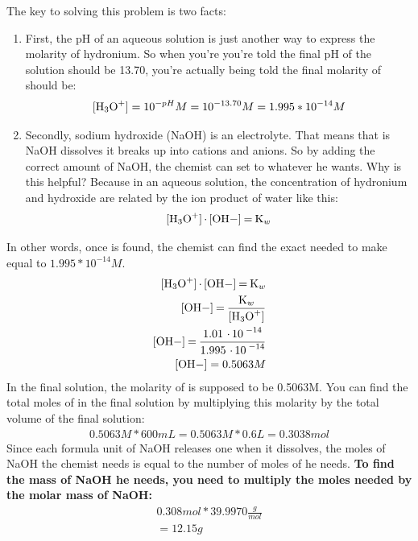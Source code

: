 \documentclass{article}  %
\begin{document}
The key to solving this problem is two facts:
\begin{enumerate}
    \item First, the pH of an aqueous solution is just another way to express \ce{[H3O+]} the molarity of hydronium. So when you're you're told the final pH of the solution should be 13.70, you're actually being told the final molarity of  should be:
    \begin{equation*}
        \begin{aligned}
            \ce{[H3O+]} = 10^{-pH}M = 10^{-13.70}M = 1.995*10^{-14}M
        \end{aligned}
    \end{equation*}
    \item Secondly, sodium hydroxide (NaOH) is an electrolyte. That means that is NaOH dissolves it breaks up into  cations and  anions. So by adding the correct amount of NaOH, the chemist can set \ce{[OH-]} to whatever he wants. Why is this helpful? Because in an aqueous solution, the concentration of hydronium and hydroxide are related by the ion product of water like this:
    \begin{equation*}
        \begin{aligned}
            \ce{[H3O+]*[OH-] = K_w}
        \end{aligned}
    \end{equation*}
\end{enumerate}
In other words, once \ce{[H3O+]} is found, the chemist can find the exact \ce{[OH-]} needed to make \ce{[H3O+]} equal to $1.995*10^{-14}M$.
\begin{equation*}
    \begin{aligned}
        \ce{[H3O+]*[OH-] = K_w} \\
        \ce{[OH-] = \frac{K_w}{[H3O+]}} \\
        \ce{[OH-] = \frac{1.01*10^{-14}}{1.995*10^{-14}}} \\
        \ce{[OH-]} = 0.5063M
    \end{aligned}
\end{equation*}
\newline
\newline
In the final solution, the molarity of  is supposed to be 0.5063M. You can find the total moles of  in the final solution by multiplying this molarity by the total volume of the final solution:
\begin{equation*}
    \begin{aligned}
        0.5063M * 600mL = 0.5063M * 0.6L = 0.3038mol
    \end{aligned}
\end{equation*}
Since each formula unit of NaOH releases one  when it dissolves, the moles of NaOH the chemist needs is equal to the number of moles of  he needs. \textbf{To find the mass of NaOH he needs, you need to multiply the moles needed by the molar mass of NaOH:}
\begin{equation*}
    \begin{aligned}
        0.308mol * 39.9970\frac{g}{mol} \\
        = 12.15g
    \end{aligned}
\end{equation*}
\end{document}
